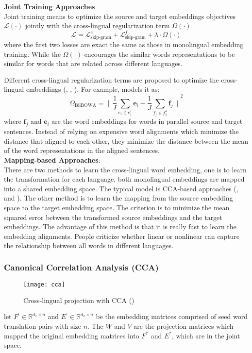 \textbf{Joint Training Approaches}\\
Joint training means to optimize the source and target embeddings objectives $\mathcal{L(\cdot)}$ jointly with the cross-lingual regularization term $\Omega(\cdot)$. 
\[ \mathcal{L} =  \mathcal{L}_{\text{skip-gram}}^e + \mathcal{L}_{\text{skip-gram}}^f + \lambda \cdot \Omega(\cdot)  \]
where the first two losses are exact the same as those in monolingual embedding training. While the $\Omega(\cdot)$  encourages the similar words representations to be similar for words that are related across different languages.

Different cross-lingual regularization terms are proposed to optimize the cross-lingual embeddings (\cite{coulmance2016trans}, \cite{luong2015bilingual}, \cite{gouws2015bilbowa}). For example, \cite{gouws2015bilbowa} models it as: 
\[ \Omega_{\text{BilBOWA}} = {\lVert \frac{1}{I}  \sum_{e_i \in e_1^I} \bm{e}_i - \frac{1}{J} \sum_{f_j \in f_1^J} \bm{f}_j\rVert}^2 \]
where $\bm{f}_j$ and $\bm{e}_i$ are the word embeddings for words in parallel source and target sentences. Instead of relying on expensive word alignments which minimize the distance that aligned to each other, they minimize the distance between the mean of the word representations in the aligned sentences. \\

\textbf{Mapping-based Approaches}: \\
There are two methods to learn the cross-lingual word embedding, one is to learn the transformation for each language, both monolingual embeddings are mapped into a shared embedding space. The typical model is CCA-based approaches (\cite{faruqui2014improving}, \cite{dhillon2011multi} and \cite{lu2015deep}). The other method is to learn the mapping from the source embedding space to the target embedding space. The criterion is to minimize the mean squared error between the transformed source embeddings and the target embeddings. The advantage of this method is that it is really fast to learn the embedding alignments. People criticize whether linear or nonlinear can capture the relationship between all words in different languages.


\subsubsection{Canonical Correlation Analysis (CCA)}
\begin{figure}[t]
	\texttt{[image: cca]}
	\centering
	\caption{Cross-lingual projection with CCA (\cite{faruqui2014improving})}
\end{figure}
let $F^{\prime} \in \mathbb{R}^{d_1 \times n}$ and $E^{\prime} \in \mathbb{R}^{d_2 \times n}$ be the embedding matrices comprised of seed word translation pairs with size $n$. The  $W$ and $V$ are the projection matrices which mapped the original embedding matrices into $F^{*}$ and $E^{*}$, which are in the joint space.


